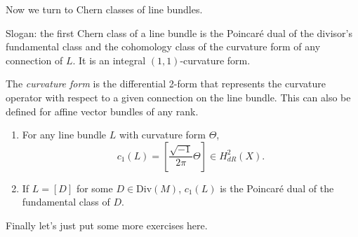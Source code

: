 \medskip\noindent
Now we turn to Chern classes of line bundles.

Slogan: the first Chern class of a line
bundle
is the Poincaré dual of the divisor's
fundamental class
and the cohomology class of the curvature
form
of any connection of $L$.
It is an integral $(1,1)$-curvature form.

The {\it curvature form} is the differential
2-form
that represents the curvature operator with
respect to a given connection
on the line bundle.
This can also be defined for affine vector
bundles of any rank.

\begin{proposition}
\label{proposition-first-chern-class}
\begin{reference}
\cite[p. 141]{gri}
\end{reference}
\begin{enumerate}
\item For any line bundle $L$ with curvature
form $\Theta$,
$$
c_1(L)=\left[\frac{\sqrt{-1}}{2\pi}
\Theta\right]
\in H^2_{dR}(X).
$$

\item If $L=[D]$ for some $D \in
\text{Div}(M)$,
$c_1(L)$ is the Poincaré dual of the
fundamental class of $D$.
\end{enumerate}
\end{proposition}

\medskip\noindent
Finally let's just put some more exercises
here.

